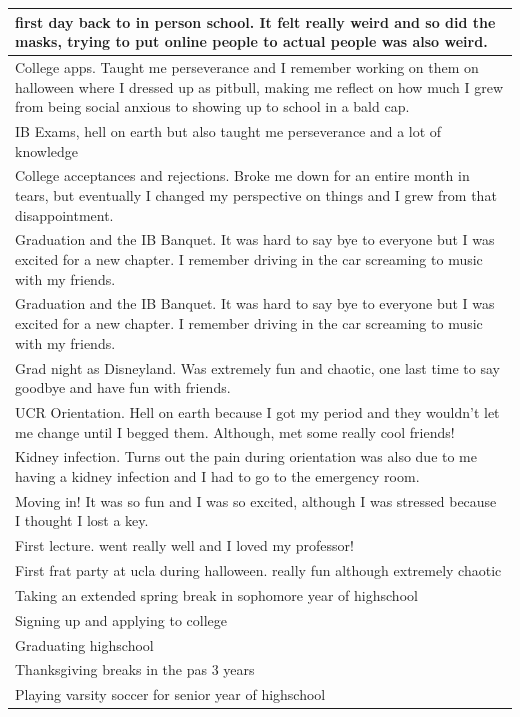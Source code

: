 \documentclass[
  .7em,
  letterpaper,
  DIV=11,
  numbers=noendperiod]{scrartcl}
\begin{document}
\begin{table}
\begin{tabular}{l}
first day back to in person school. It felt really weird and so did the masks, trying to put online people to actual people was also weird.\\
\hline
College apps. Taught me perseverance and I remember working on them on halloween where I dressed up as pitbull, making me reflect on how much I grew from being social anxious to showing up to school in a bald cap.\\
\hline
IB Exams, hell on earth but also taught me perseverance and a lot of knowledge\\
\hline
College acceptances and rejections. Broke me down for an entire month in tears, but eventually I changed my perspective on things and I grew from that disappointment.\\
\hline
Graduation and the IB Banquet. It was hard to say bye to everyone but I was excited for a new chapter. I remember driving in the car screaming to music with my friends.\\
\hline
Graduation and the IB Banquet. It was hard to say bye to everyone but I was excited for a new chapter. I remember driving in the car screaming to music with my friends.\\
\hline
Grad night as Disneyland. Was extremely fun and chaotic, one last time to say goodbye and have fun with friends.\\
\hline
UCR Orientation. Hell on earth because I got my period and they wouldn't let me change until I begged them. Although, met some really cool friends!\\
\hline
Kidney infection. Turns out the pain during orientation was also due to me having a kidney infection and I had to go to the emergency room.\\
\hline
Moving in! It was so fun and I was so excited, although I was stressed because I thought I lost a key.\\
\hline
First lecture. went really well and I loved my professor!\\
\hline
First frat party at ucla during halloween. really fun although extremely chaotic\\
\hline
Taking an extended spring break in sophomore year of highschool\\
\hline
Signing up and applying to college\\
\hline
Graduating highschool\\
\hline
Thanksgiving breaks in the pas 3 years\\
\hline
Playing varsity soccer for senior year of highschool\\

\end{tabular}
\end{table}
\end{document}
